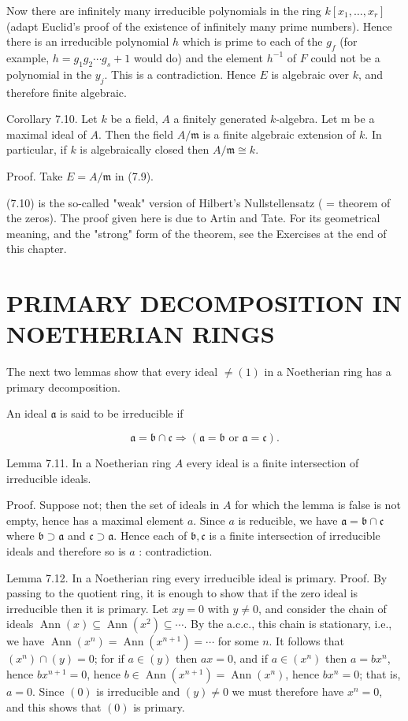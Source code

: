 \documentclass{standalone}
\theoremstyle{definition}
\theoremstyle{remark}
\begin{document}
Now there are infinitely many irreducible polynomials in the ring $k\left[x_{1}, \ldots, x_{r}\right]$ (adapt Euclid's proof of the existence of infinitely many prime numbers). Hence there is an irreducible polynomial $h$ which is prime to each of the $g_{f}$ (for example, $h=g_{1} g_{2} \cdots g_{s}+1$ would do) and the element $h^{-1}$ of $F$ could not be a polynomial in the $y_{j}$. This is a contradiction. Hence $E$ is algebraic over $k$, and therefore finite algebraic.

Corollary 7.10. Let $k$ be a field, $A$ a finitely generated $k$-algebra. Let m be a maximal ideal of $A$. Then the field $A / \mathfrak{m}$ is a finite algebraic extension of $k$. In particular, if $k$ is algebraically closed then $A / \mathfrak{m} \cong k$.

Proof. Take $E=A / \mathfrak{m}$ in (7.9).

(7.10) is the so-called "weak" version of Hilbert's Nullstellensatz ( = theorem of the zeros). The proof given here is due to Artin and Tate. For its geometrical meaning, and the "strong" form of the theorem, see the Exercises at the end of this chapter.

\section{PRIMARY DECOMPOSITION IN NOETHERIAN RINGS}
The next two lemmas show that every ideal $\neq(1)$ in a Noetherian ring has a primary decomposition.

An ideal $\mathfrak{a}$ is said to be irreducible if

\[
\mathfrak{a}=\mathfrak{b} \cap \mathfrak{c} \Rightarrow(\mathfrak{a}=\mathfrak{b} \text { or } \mathfrak{a}=\mathfrak{c}) .
\]

Lemma 7.11. In a Noetherian ring $A$ every ideal is a finite intersection of irreducible ideals.

Proof. Suppose not; then the set of ideals in $A$ for which the lemma is false is not empty, hence has a maximal element $a$. Since $a$ is reducible, we have $\mathfrak{a}=\mathfrak{b} \cap \mathfrak{c}$ where $\mathfrak{b} \supset \mathfrak{a}$ and $\mathfrak{c} \supset \mathfrak{a}$. Hence each of $\mathfrak{b}, \mathfrak{c}$ is a finite intersection of irreducible ideals and therefore so is $a$ : contradiction.

Lemma 7.12. In a Noetherian ring every irreducible ideal is primary. Proof. By passing to the quotient ring, it is enough to show that if the zero ideal is irreducible then it is primary. Let $x y=0$ with $y \neq 0$, and consider the chain of ideals $\operatorname{Ann}(x) \subseteq \operatorname{Ann}\left(x^{2}\right) \subseteq \cdots$. By the a.c.c., this chain is stationary, i.e., we have $\operatorname{Ann}\left(x^{n}\right)=\operatorname{Ann}\left(x^{n+1}\right)=\cdots$ for some $n$. It follows that $\left(x^{n}\right) \cap(y)=0$; for if $a \in(y)$ then $a x=0$, and if $a \in\left(x^{n}\right)$ then $a=b x^{n}$, hence $b x^{n+1}=0$, hence $b \in \operatorname{Ann}\left(x^{n+1}\right)=\operatorname{Ann}\left(x^{n}\right)$, hence $b x^{n}=0$; that is, $a=0$. Since $(0)$ is irreducible and $(y) \neq 0$ we must therefore have $x^{n}=0$, and this shows that $(0)$ is primary.
\end{document}
